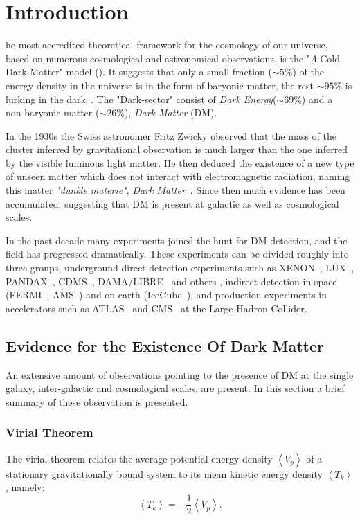 %
%
\let\textcircled=\pgftextcircled
\chapter{Introduction}
\label{chap:intro}

he most accredited theoretical framework for the cosmology of our universe, based on numerous cosmological and astronomical observations, is the "$\Lambda$-Cold Dark Matter" model (\cdm). It suggests that only a small fraction ($\sim 5\%$) of the energy density in the universe is in the form of baryonic matter, the rest  $\sim 95\%$ is lurking in the dark~\cite{WMAP:9years, Planck}. The "Dark-sector" consist of \textit{Dark Energy}($\sim 69\%$) and a non-baryonic matter ($\sim 26\%$), \textit{Dark Matter} (DM).

In the 1930s the Swiss astronomer Fritz Zwicky observed that the mass of the cluster inferred by gravitational observation is much larger than the one inferred by the visible luminous light matter. He then deduced the existence of a new type of unseen matter which does not interact with electromagnetic radiation, naming this matter \textit{"dunkle materie"}, \textit{Dark Matter}~\cite{Zwicky:1937zza}. Since then much evidence has been accumulated, suggesting that DM is present at galactic as well as cosmological scales.

In the past decade many experiments joined the hunt for DM detection, and the field has progressed dramatically. These experiments can be divided
roughly into three groups, underground direct detection experiments such as XENON~\cite{xe100_run_combination,Xenon1TResults}, LUX~\cite{LUXnew}, PANDAX~\cite{PANDAX}, CDMS~\cite{CDMSlite}, DAMA/LIBRE~\cite{DAMA} and others , indirect detection in space (FERMI~\cite{FermiLAT:2011ab}, AMS~\cite{AMS}) and on earth (IceCube~\cite{IceCube}), and production experiments in accelerators such as ATLAS~\cite{AtlasDM} and CMS~\cite{CmsDM} at the Large Hadron Collider.
\section{Evidence for the Existence Of Dark Matter}
\label{sec:Evidence}
An extensive amount of observations pointing to the presence of DM at the  single galaxy, inter-galactic and cosmological scales, are present. In this section a brief summary of these observation is presented. 

\subsection{Virial Theorem}
\label{subsec:virial}
The virial theorem relates the average potential energy density $\left\langle V_p \right\rangle$ of a stationary gravitationally bound system to its mean kinetic energy density $\left\langle T_k \right\rangle $, namely:
\begin{equation}
\left\langle T_k \right\rangle  =-\frac{1}{2}\left\langle V_p \right\rangle.
\end{equation}


